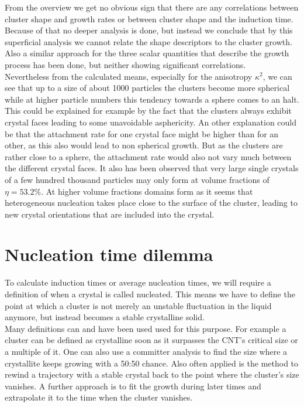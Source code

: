 From the overview we get no obvious sign that there are any correlations between cluster shape and growth rates or between cluster shape and the induction time. Because of that no deeper analysis is done, but instead we conclude that by this superficial analysis we cannot relate the shape descriptors to the cluster growth. Also a similar approach for the three scalar quantities that describe the growth process has been done, but neither showing significant correlations.\\  

Nevertheless from the calculated means, especially for the anisotropy $\kappa^2$, we can see that up to a size of about 1000 particles the clusters become more spherical while at higher particle numbers this tendency towards a sphere comes to an halt. This could be explained for example by the fact that the clusters always exhibit crystal faces leading to some unavoidable asphericity. An other explanation could be that the attachment rate for one crystal face might be higher than for an other, as this also would lead to non spherical growth. But as the clusters are rather close to a sphere, the attachment rate would also not vary much between the different crystal faces. It also has been observed that very large single crystals of a few hundred thousand particles may only form at volume fractions of $\eta = 53.2 \%$. At higher volume fractions domains form as it seems that heterogeneous nucleation takes place close to the surface of the cluster, leading to new crystal orientations that are included into the crystal.\\


\section{Nucleation time dilemma}
\label{sec:nucleation_times}
To calculate induction times or average nucleation times, we will require a definition of when a crystal is called nucleated. This means we have to define the point at which a cluster is not merely an unstable fluctuation in the liquid anymore, but instead becomes a stable crystalline solid.\\
Many definitions can and have been used used for this purpose. For example a cluster can be defined as crystalline soon as it surpasses the CNT's critical size or a multiple of it. One can also use a committer analysis to find the size where a crystallite keeps growing with a 50:50 chance. Also often applied is the method to rewind a trajectory with a stable crystal back to the point where the cluster's size vanishes. A further approach is to fit the growth during later times and extrapolate it to the time when the cluster vanishes.\\

